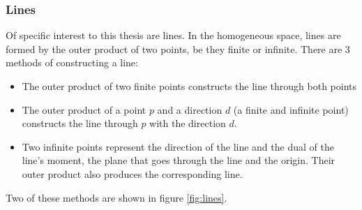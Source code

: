 \documentclass[a4paper, 10pt]{article}
\begin{document}
\subsubsection{Lines}
Of specific interest to this thesis are lines. In the homogeneous space, lines
are formed by the outer product of two points, be they finite or infinite.
There are 3 methods of constructing a line:
\begin{itemize}
  \item The outer product of two finite points constructs the line through
    both points
  \item The outer product of a point $p$ and a direction $d$ (a finite and infinite
    point) constructs the line through $p$ with the direction $d$.
  \item Two infinite points represent the direction of the line and the dual of
    the line's moment, the plane that goes through the line and the origin.
    Their outer product also produces the corresponding line.
\end{itemize}
Two of these methods are shown in figure \ref{fig:lines}.
\end{document}

